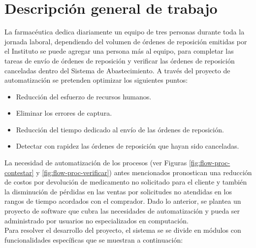 \documentclass[letterpaper,11pt]{article}
\begin{document}
\section{Descripción general de trabajo}
La farmacéutica dedica diariamente un equipo de tres personas durante toda la jornada laboral, dependiendo del volumen de órdenes de reposición emitidas por el Instituto se puede agregar una persona más al equipo, para completar las tareas de envío de órdenes de reposición y verificar las órdenes de reposición canceladas dentro del Sistema de Abastecimiento. A través del proyecto de automatización se pretenden optimizar los siguientes puntos:
\begin{itemize}
\item Reducción del esfuerzo de recursos humanos.
\item Eliminar los errores de captura.
\item Reducción del tiempo dedicado al envío de las órdenes de reposición.
\item Detectar con rapidez las órdenes de reposición que hayan sido canceladas.
\end{itemize}
La necesidad de automatización de los procesos (ver Figuras \ref{fig:flow-proc-contestar} y \ref{fig:flow-proc-verificar}) antes mencionados pronostican una reducción de costos por devolución de medicamento no solicitado para el cliente y también la disminución de pérdidas en las ventas por solicitudes no atendidas en los rangos de tiempo acordados con el comprador. Dado lo anterior, se plantea un proyecto de software que cubra las necesidades de automatización y pueda ser administrado por usuarios no especializados en computación.\\
Para resolver el desarrollo del proyecto, el sistema se se divide en módulos con funcionalidades específicas que se muestran a continuación:
\end{document}
